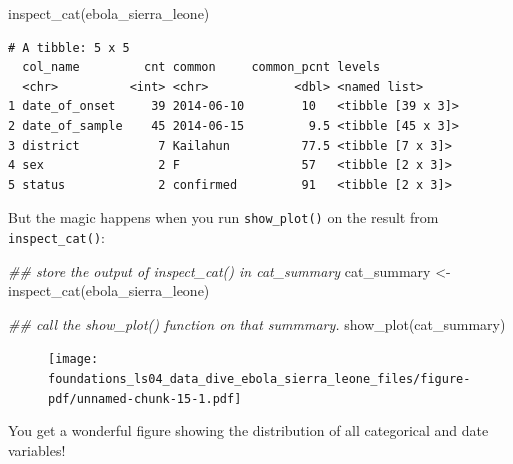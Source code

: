 \documentclass[
  letterpaper,
  DIV=11,
  numbers=noendperiod]{scrreprt}
\newenvironment{Shaded}{\begin{snugshade}}{\end{snugshade}}
\newcommand{\DocumentationTok}[1]{\textcolor[rgb]{0.37,0.37,0.37}{\textit{#1}}}
\newcommand{\FunctionTok}[1]{\textcolor[rgb]{0.28,0.35,0.67}{#1}}
\newcommand{\NormalTok}[1]{\textcolor[rgb]{0.00,0.23,0.31}{#1}}
\newcommand{\OtherTok}[1]{\textcolor[rgb]{0.00,0.23,0.31}{#1}}
\begin{document}
\begin{Shaded}
\begin{Highlighting}[]
\FunctionTok{inspect\_cat}\NormalTok{(ebola\_sierra\_leone)}
\end{Highlighting}
\end{Shaded}

\begin{verbatim}
# A tibble: 5 x 5
  col_name         cnt common     common_pcnt levels           
  <chr>          <int> <chr>            <dbl> <named list>     
1 date_of_onset     39 2014-06-10        10   <tibble [39 x 3]>
2 date_of_sample    45 2014-06-15         9.5 <tibble [45 x 3]>
3 district           7 Kailahun          77.5 <tibble [7 x 3]> 
4 sex                2 F                 57   <tibble [2 x 3]> 
5 status             2 confirmed         91   <tibble [2 x 3]> 
\end{verbatim}

But the magic happens when you run \texttt{show\_plot()} on the result
from \texttt{inspect\_cat()}:

\begin{Shaded}
\begin{Highlighting}[]
\DocumentationTok{\#\# store the output of \textasciigrave{}inspect\_cat()\textasciigrave{} in \textasciigrave{}cat\_summary\textasciigrave{}}
\NormalTok{cat\_summary }\OtherTok{\textless{}{-}} \FunctionTok{inspect\_cat}\NormalTok{(ebola\_sierra\_leone)}

\DocumentationTok{\#\# call the \textasciigrave{}show\_plot()\textasciigrave{} function on that summmary.}
\FunctionTok{show\_plot}\NormalTok{(cat\_summary)}
\end{Highlighting}
\end{Shaded}

\begin{figure}[H]

{\centering \texttt{[image: foundations\_ls04\_data\_dive\_ebola\_sierra\_leone\_files/figure-pdf/unnamed-chunk-15-1.pdf]}

}

\end{figure}

You get a wonderful figure showing the distribution of all categorical
and date variables!
\end{document}
